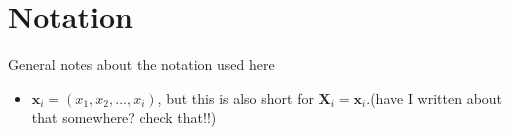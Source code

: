 \chapter{Notation}

General notes about the notation used here
\begin{itemize}
    \item $\textbf{x}_i = (x_1,x_2,...,x_i)$, but this is also short for $\textbf{X}_i=\textbf{x}_i$.(have I written about that somewhere? check that!!)
\end{itemize}